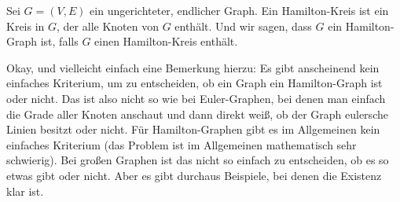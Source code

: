 \begin{math-stroke}
\end{math-stroke}

\begin{spoken-clean}[00:32:29 - 00:34:16]
Sei $G = (V, E)$ ein ungerichteter, endlicher Graph. Ein Hamilton-Kreis ist ein Kreis in $G$, der alle Knoten von $G$ enthält. Und wir sagen, dass $G$ ein Hamilton-Graph ist, falls $G$ einen Hamilton-Kreis enthält.

Okay, und vielleicht einfach eine Bemerkung hierzu: Es gibt anscheinend kein einfaches Kriterium, um zu entscheiden, ob ein Graph ein Hamilton-Graph ist oder nicht. Das ist also nicht so wie bei Euler-Graphen, bei denen man einfach die Grade aller Knoten anschaut und dann direkt weiß, ob der Graph eulersche Linien besitzt oder nicht. Für Hamilton-Graphen gibt es im Allgemeinen kein einfaches Kriterium (das Problem ist im Allgemeinen mathematisch sehr schwierig). Bei großen Graphen ist das nicht so einfach zu entscheiden, ob es so etwas gibt oder nicht. Aber es gibt durchaus Beispiele, bei denen die Existenz klar ist.
\end{spoken-clean}

\begin{ai-global-state-checkpoint-invisible-content}
\end{ai-global-state-checkpoint-invisible-content}

\begin{math-stroke}
\end{math-stroke}

